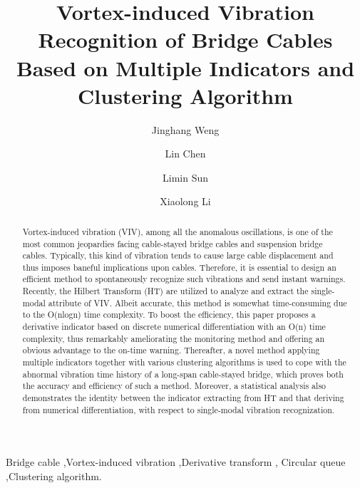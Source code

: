 \documentclass[preprint, 3p, times, compress, 11pt]{elsarticle}
\begin{document}
\begin{frontmatter}
\title{Vortex-induced Vibration Recognition of Bridge Cables 
        Based on Multiple Indicators and Clustering Algorithm}
\author[tongji]{Jinghang Weng}
\author[tongji]{Lin Chen}
\author[tongji,lab,qizhi]{Limin Sun}
\author[ccc]{Xiaolong Li}
\address[tongji]{Department of Bridge Engineering, Tongji University, 
    Shanghai 200092, China}
\address[lab]{State Key Laboratory of Disaster Reduction of Civil 
    Engineering, Tongji University, Shanghai 200092, China}
\address[qizhi]{Shanghai Qi Zhi Institute, Shanghai 200092, China}
\address[ccc]{China Communications Construction Ltd., Beijing 100101, China}

\begin{abstract}
Vortex-induced vibration (VIV), among all the anomalous oscillations, 
is one of the most common jeopardies facing cable-stayed bridge cables 
and suspension bridge cables. Typically, this kind of vibration tends 
to cause large cable displacement and thus imposes baneful implications 
upon cables. Therefore, it is essential to design an efficient method 
to spontaneously recognize such vibrations and send instant warnings. 
Recently, the Hilbert Transform (HT) are utilized to analyze and extract 
the single-modal attribute of VIV. Albeit accurate, this method is 
somewhat time-consuming due to the O(nlogn) time complexity. To boost 
the efficiency, this paper proposes a derivative indicator based on 
discrete numerical differentiation with an O(n) time complexity, thus 
remarkably ameliorating the monitoring method and offering an obvious 
advantage to the on-time warning. Thereafter, a novel method applying 
multiple indicators together with various clustering algorithms is used 
to cope with the abnormal vibration time history of a long-span 
cable-stayed bridge, which proves both the accuracy and efficiency of 
such a method. Moreover, a statistical analysis also demonstrates the 
identity between the indicator extracting from HT and that deriving from 
numerical differentiation, with respect to single-modal vibration 
recognization. 
\end{abstract}

\begin{keyword}
Bridge cable \sep Vortex-induced vibration \sep Derivative transform \sep 
Circular queue \sep Clustering algorithm. 
\end{keyword}
\end{frontmatter}
\end{document}
